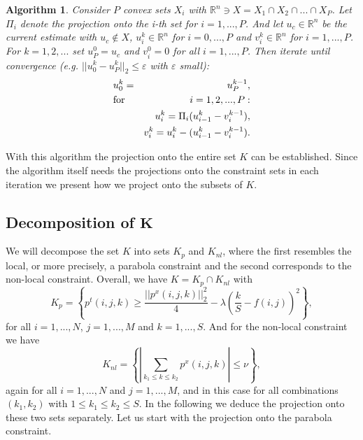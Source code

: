 \documentclass[abstracton]{scrreprt}
\newtheorem{algorithm}[theorem]{Algorithm}
\begin{document}
            \begin{algorithm}
            \label{alg:dykstra}
                Consider $P$ convex sets $X_{i}$ with $\mathbb{R}^{n} \ni X = X_{1} \cap X_{2} \cap ... \cap X_{P}$. Let $\Pi_{i}$ denote the projection onto the i-th set for $i = 1, ..., P$. And let $u_{c} \in \mathbb{R}^{n}$ be the current estimate with $u_{c} \notin X$, $u_{i}^{k} \in \mathbb{R}^{n}$ for $i = 0, ..., P$ and $v_{i}^{k} \in \mathbb{R}^{n}$ for $i = 1, ..., P$. For $k = 1, 2, ...$ set $u^{0}_{P} = u_{c}$ and $v^{0}_{i} = 0$ for all $i = 1, ..., P$. Then iterate until convergence (e.g. $||u_{0}^{k} - u_{P}^{k}||_{2} \le \varepsilon$ with $\varepsilon$ small):
                \begin{eqnarray}
                    &u_{0}^{k} = &u_{P}^{k-1}, \notag \\
                    &\textnormal{for} \,\, &i = 1, 2, ..., P: \notag \\
                    &&u_{i}^{k} = \Pi_{i}(u_{i-1}^{k} - v_{i}^{k-1}), \notag \\
                    &&v_{i}^{k} = u_{i}^{k} - (u_{i-1}^{k} - v_{i}^{k-1}). \notag
                \end{eqnarray}
            \end{algorithm}
            With this algorithm the projection onto the entire set $K$ can be established. Since the algorithm itself needs the projections onto the constraint sets in each iteration we present how we project onto the subsets of $K$.
        \subsection{Decomposition of $\boldsymbol{K}$} %
        \label{sub:decomposition_of_K}
            We will decompose the set $K$ into sets $K_{p}$ and $K_{nl}$, where the first resembles the local, or more precisely, a parabola constraint and the second corresponds to the non-local constraint. Overall, we have $K = K_{p} \cap K_{nl}$ with
                $$
                    K_{p} = \left\{ p^{t}(i, j, k) \ge \frac{||p^{x}(i, j, k)||_{2}^{2}}{4} - \lambda(\frac{k}{S} - f(i,j))^{2} \right\},
                $$
            for all $i = 1, ..., N$, $j = 1, ..., M$ and $k = 1, ..., S$. And for the non-local constraint we have
                $$
                    K_{nl} = \left\{ \left| \sum_{k_{1} \le k \le k_{2}} p^{x}(i, j, k) \right| \le \nu \right\},
                $$
            again for all $i = 1, ..., N$ and $j = 1, ..., M$, and in this case for all combinations $(k_{1}, k_{2})$ with $1 \le k_{1} \le k_{2} \le S$. In the following we deduce the projection onto these two sets separately. Let us start with the projection onto the parabola constraint.
\end{document}
